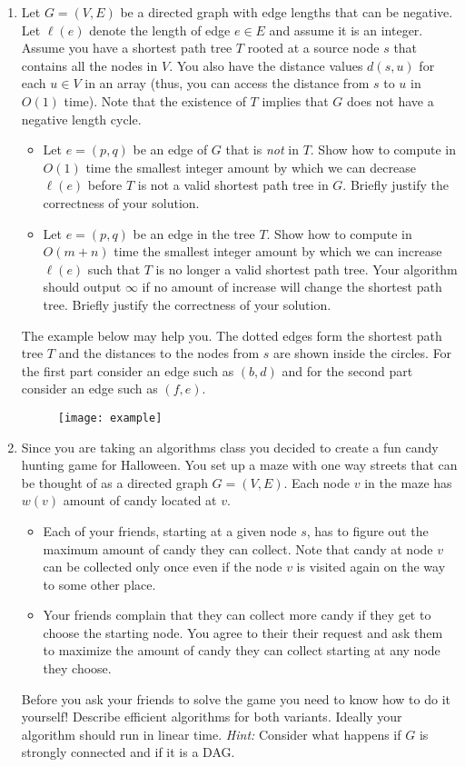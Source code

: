 \documentclass[11pt]{article}
\begin{document}
\begin{enumerate}
\item 
  Let $G=(V,E)$ be a directed graph with edge lengths that can be
  negative. Let $\ell(e)$ denote the length of edge $e \in E$ and
  assume it is an integer. Assume you have a shortest path tree $T$
  rooted at a source node $s$ that contains all the nodes in $V$. You
  also have the distance values $d(s,u)$ for each $u \in V$ in an
  array (thus, you can access the distance from $s$ to $u$ in $O(1)$
  time). Note that the existence of $T$ implies that $G$ does not have
  a negative length cycle. 
  \begin{itemize}
  \item  Let $e=(p,q)$ be an edge of $G$ that is {\em not} in
    $T$. Show how to compute in $O(1)$ time the smallest
    integer amount by which we can decrease $\ell(e)$ before $T$
    is not a valid shortest path tree in $G$. Briefly justify the correctness of your solution.
  \item Let $e=(p,q)$ be an edge in the tree $T$. Show how to
  compute in $O(m+n)$ time the smallest integer amount by which we can 
  increase $\ell(e)$ such that $T$ is no longer a valid shortest path tree. 
  Your algorithm should output $\infty$ if no amount of increase will
  change the shortest path tree. Briefly justify the correctness of your solution.
  \end{itemize}
  The example below may help you. The dotted 
 edges form the shortest path tree $T$ and the distances to the nodes
  from $s$ are shown inside the circles. For the first part consider
  an edge such as $(b,d)$ and for the second part consider an edge
  such as $(f,e)$.
\begin{figure}[h]
  \centering
  \texttt{[image: example]}
\end{figure}

\item Since you are taking an algorithms class you decided to create a
  fun candy hunting game for Halloween. You set up a maze with one
  way streets that can be thought of as a directed graph
  $G=(V,E)$. Each node $v$ in the maze has $w(v)$ amount of candy
  located at $v$.
  \begin{itemize}
  \item Each of your friends, starting at a given node $s$, has to
    figure out the maximum amount of candy they can collect. Note that
    candy at node $v$ can be collected only once even if the node $v$
    is visited again on the way to some other place.
  \item Your friends complain that they can collect more candy if they
    get to choose the starting node. You agree to their their request
    and ask them to maximize the amount of candy they can collect
    starting at any node they choose.
  \end{itemize}
  Before you ask your friends to solve the game you need to know how
  to do it yourself!  Describe efficient algorithms for both variants.
  Ideally your algorithm should run in linear time.
  {\em Hint:} Consider what happens if $G$ is strongly connected and
  if it is a DAG.


\end{enumerate}
\end{document}
